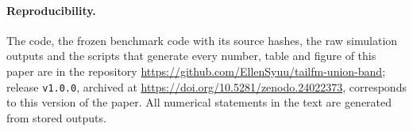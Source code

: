 \documentclass[11pt]{article}
\theoremstyle{definition}
\theoremstyle{remark}
\numberwithin{equation}{section}
\begin{document}
\paragraph{Reproducibility.} The code, the frozen benchmark code with its source hashes, the raw simulation outputs and the scripts that generate every number, table and figure of this paper are in the repository \url{https://github.com/EllenSyuu/tailfm-union-band}; release \texttt{v1.0.0}, archived at \url{https://doi.org/10.5281/zenodo.24022373}, corresponds to this version of the paper. All numerical statements in the text are generated from stored outputs.




\appendix

\end{document}
